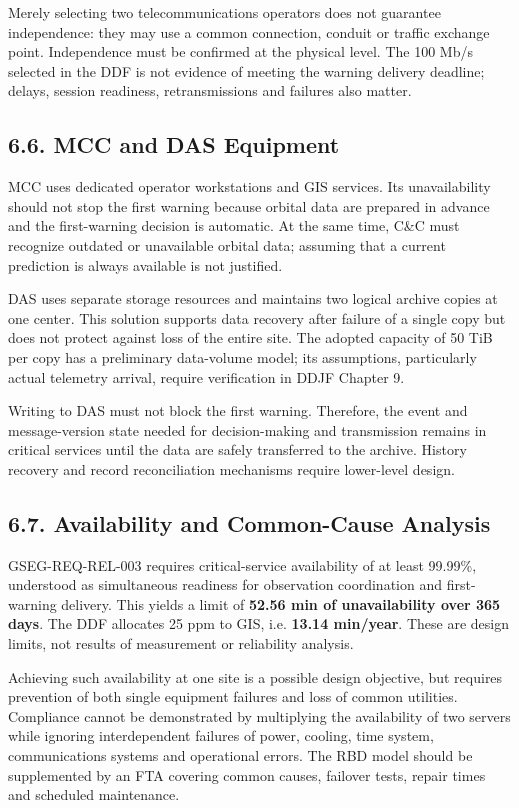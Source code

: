 Merely selecting two telecommunications operators does not guarantee independence: they may use a common connection, conduit or traffic exchange point. Independence must be confirmed at the physical level. The 100 Mb/\allowbreak{}s selected in the DDF is not evidence of meeting the warning delivery deadline; delays, session readiness, retransmissions and failures also matter.

\subsection{6.6. MCC and DAS Equipment}\label{ddjf-6-6}

MCC uses dedicated operator workstations and GIS services. Its unavailability should not stop the first warning because orbital data are prepared in advance and the first-warning decision is automatic. At the same time, C\&C must recognize outdated or unavailable orbital data; assuming that a current prediction is always available is not justified.

DAS uses separate storage resources and maintains two logical archive copies at one center. This solution supports data recovery after failure of a single copy but does not protect against loss of the entire site. The adopted capacity of 50 TiB per copy has a preliminary data-volume model; its assumptions, particularly actual telemetry arrival, require verification in DDJF Chapter 9.

Writing to DAS must not block the first warning. Therefore, the event and message-version state needed for decision-making and transmission remains in critical services until the data are safely transferred to the archive. History recovery and record reconciliation mechanisms require lower-level design.

\subsection{6.7. Availability and Common-Cause Analysis}\label{ddjf-6-7}

GSEG-REQ-REL-003 requires critical-service availability of at least 99.99\%, understood as simultaneous readiness for observation coordination and first-warning delivery. This yields a limit of \textbf{52.56 min of unavailability over 365 days}. The DDF allocates 25 ppm to GIS, i.e. \textbf{13.14 min/\allowbreak{}year}. These are design limits, not results of measurement or reliability analysis.

Achieving such availability at one site is a possible design objective, but requires prevention of both single equipment failures and loss of common utilities. Compliance cannot be demonstrated by multiplying the availability of two servers while ignoring interdependent failures of power, cooling, time system, communications systems and operational errors. The RBD model should be supplemented by an FTA covering common causes, failover tests, repair times and scheduled maintenance.

